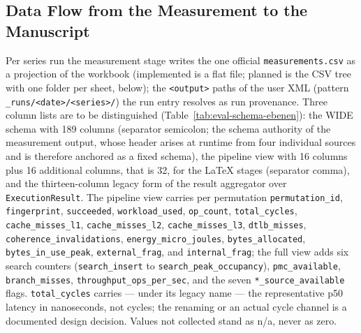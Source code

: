 \begin{nurlang}
\subsection{Data Flow from the Measurement to the Manuscript}\label{sec:eval-dataflow}
Per series run the measurement stage writes the one official \texttt{measurements.csv} as a
projection of the workbook (implemented is a flat file; planned is the CSV tree with one folder per
sheet, below); the \texttt{<output>} paths of the user XML (pattern
\texttt{\_runs/<date>/<series>/}) the run entry resolves as run provenance. Three column lists are
to be distinguished (Table~\ref{tab:eval-schema-ebenen}): the WIDE schema with 189 columns (separator
semicolon; the schema authority of the measurement output, whose header arises at runtime from four
individual sources and is therefore anchored as a fixed schema), the pipeline view with 16 columns
plus 16 additional columns, that is 32, for the LaTeX stages (separator comma), and the
thirteen-column legacy form of the result aggregator over \texttt{ExecutionResult}. The pipeline
view carries per permutation \texttt{permutation\_id}, \texttt{fingerprint}, \texttt{succeeded},
\texttt{workload\_used}, \texttt{op\_count}, \texttt{total\_cycles}, \texttt{cache\_misses\_l1},
\texttt{cache\_misses\_l2}, \texttt{cache\_misses\_l3}, \texttt{dtlb\_misses},
\texttt{coherence\_\allowbreak{}invalidations},
\texttt{energy\_\allowbreak{}micro\_\allowbreak{}joules}, \texttt{bytes\_\allowbreak{}allocated}, \texttt{bytes\_\allowbreak{}in\_\allowbreak{}use\_\allowbreak{}peak},
\texttt{external\_\allowbreak{}frag}, and \texttt{internal\_\allowbreak{}frag}; the full view adds six search counters
(\texttt{search\_\allowbreak{}insert} to \texttt{search\_\allowbreak{}peak\_\allowbreak{}occupancy}), \texttt{pmc\_\allowbreak{}available},
\texttt{branch\_\allowbreak{}misses}, \texttt{throughput\_\allowbreak{}ops\_\allowbreak{}per\_\allowbreak{}sec}, and the seven
\texttt{*\_\allowbreak{}source\_\allowbreak{}available} flags. \texttt{total\_cycles} carries --- under its legacy name ---
the representative p50 latency in nanoseconds, not cycles; the renaming or an actual cycle channel is
a documented design decision. Values not collected stand as n/a, never as zero.
\begin{table}[htbp]\centering\footnotesize
\begin{tabular}{@{}l>{\raggedright\arraybackslash}p{1.5cm}>{\raggedright\arraybackslash}p{1.9cm}>{\raggedright\arraybackslash}p{4.6cm}>{\raggedright\arraybackslash}p{4.0cm}@{}}

\end{tabular}
\end{table}
\end{nurlang}
